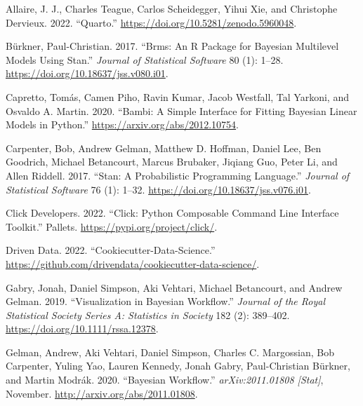 \documentclass[
  letterpaper,
  DIV=11,
  numbers=noendperiod]{scrartcl}
\newlength{\cslhangindent}
\newlength{\cslentryspacingunit} %
\newenvironment{CSLReferences}[2] %
 {%
  \setlength{\parindent}{0pt}
  \ifodd #1
  \let\oldpar\par
  \def\par{\hangindent=\cslhangindent\oldpar}
  \fi
  \setlength{\parskip}{#2\cslentryspacingunit}
 }%
 {}
\begin{document}
\hypertarget{refs}{}
\begin{CSLReferences}{1}{0}
\leavevmode{}%
Allaire, J. J., Charles Teague, Carlos Scheidegger, Yihui Xie, and
Christophe Dervieux. 2022. {``Quarto.''}
\url{https://doi.org/10.5281/zenodo.5960048}.

\leavevmode{}%
Bürkner, Paul-Christian. 2017. {``Brms: {An R} Package for {Bayesian}
Multilevel Models Using {Stan}.''} \emph{Journal of Statistical
Software} 80 (1): 1--28. \url{https://doi.org/10.18637/jss.v080.i01}.

\leavevmode{}%
Capretto, Tomás, Camen Piho, Ravin Kumar, Jacob Westfall, Tal Yarkoni,
and Osvaldo A. Martin. 2020. {``Bambi: {A} Simple Interface for Fitting
{Bayesian} Linear Models in {Python}.''}
\url{https://arxiv.org/abs/2012.10754}.

\leavevmode{}%
Carpenter, Bob, Andrew Gelman, Matthew D. Hoffman, Daniel Lee, Ben
Goodrich, Michael Betancourt, Marcus Brubaker, Jiqiang Guo, Peter Li,
and Allen Riddell. 2017. {``Stan: {A Probabilistic Programming
Language}.''} \emph{Journal of Statistical Software} 76 (1): 1--32.
\url{https://doi.org/10.18637/jss.v076.i01}.

\leavevmode{}%
Click Developers. 2022. {``Click: {Python} Composable Command Line
Interface Toolkit.''} Pallets. \url{https://pypi.org/project/click/}.

\leavevmode{}%
Driven Data. 2022. {``Cookiecutter-Data-Science.''}
\url{https://github.com/drivendata/cookiecutter-data-science/}.

\leavevmode{}%
Gabry, Jonah, Daniel Simpson, Aki Vehtari, Michael Betancourt, and
Andrew Gelman. 2019. {``Visualization in {Bayesian Workflow}.''}
\emph{Journal of the Royal Statistical Society Series A: Statistics in
Society} 182 (2): 389--402. \url{https://doi.org/10.1111/rssa.12378}.

\leavevmode{}%
Gelman, Andrew, Aki Vehtari, Daniel Simpson, Charles C. Margossian, Bob
Carpenter, Yuling Yao, Lauren Kennedy, Jonah Gabry, Paul-Christian
Bürkner, and Martin Modrák. 2020. {``Bayesian {Workflow}.''}
\emph{arXiv:2011.01808 {[}Stat{]}}, November.
\url{http://arxiv.org/abs/2011.01808}.


\end{CSLReferences}
\end{document}
